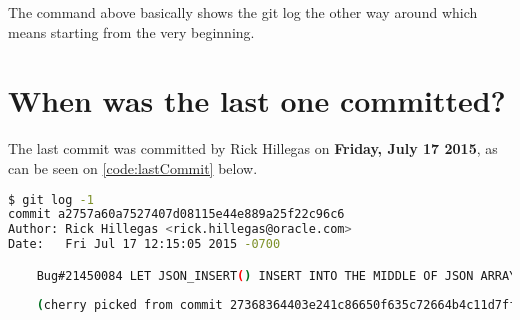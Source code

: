 The command above basically shows the git log the other way around which means starting from the very beginning. 

\section*{When was the last one committed?}
The last commit was committed by Rick Hillegas on \textbf{Friday, July 17 2015}, as can be seen on \autoref{code:lastCommit} below.

\begin{lstlisting}[language=bash,caption=Command to get last commit., label=code:lastCommit]
$ git log -1
commit a2757a60a7527407d08115e44e889a25f22c96c6
Author: Rick Hillegas <rick.hillegas@oracle.com>
Date:   Fri Jul 17 12:15:05 2015 -0700

    Bug#21450084 LET JSON_INSERT() INSERT INTO THE MIDDLE OF JSON ARRAYS.
    
    (cherry picked from commit 27368364403e241c86650f635c72664b4c11d7ff)
\end{lstlisting}
